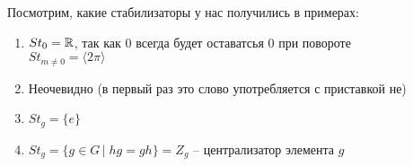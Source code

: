 Посмотрим, какие стабилизаторы у нас получились в примерах:
\begin{enumerate}
    \item $St_0 = \mathbb{R}$, так как 0 всегда будет оставатсья 0 при повороте \\ $St_{m \neq 0} = \langle 2\pi \rangle$
    \item Неочевидно (в первый раз это слово употребляется с приставкой не)
    \item $St_g = \{ e \}$
    \item $St_g = \{ g \in G \, | \; hg = gh \} = Z_g$ -- централизатор элемента $g$ 
\end{enumerate}